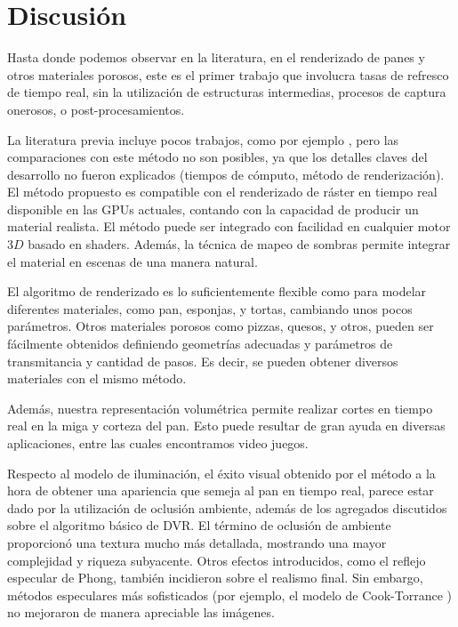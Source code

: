 \section{Discusión}


Hasta donde podemos observar en la literatura, en el renderizado de panes y otros materiales porosos, este es el primer trabajo que involucra tasas de refresco de tiempo real, sin la utilización de estructuras intermedias, procesos de captura onerosos, o post-procesamientos.

La literatura previa incluye pocos trabajos, como por ejemplo \cite{Cho2007}, pero las comparaciones con este método no son posibles, ya que los detalles claves del desarrollo no fueron explicados (tiempos de cómputo, método de renderización).
El método propuesto es compatible con el renderizado de ráster en tiempo real disponible en las GPUs actuales, contando con la capacidad de producir un material realista.
El método puede ser integrado con facilidad en cualquier motor $3D$ basado en shaders.
Además, la técnica de mapeo de sombras permite integrar el material en escenas de una manera natural.


El algoritmo de renderizado es lo suficientemente flexible como para modelar diferentes materiales, como pan, esponjas, y tortas, cambiando unos pocos parámetros.
Otros materiales porosos como pizzas, quesos, y otros, pueden ser fácilmente obtenidos definiendo geometrías adecuadas y parámetros de transmitancia y cantidad de pasos.
Es decir, se pueden obtener diversos materiales con el mismo método.

Además, nuestra representación volumétrica permite realizar cortes en tiempo real en la miga y corteza del pan.
Esto puede resultar de gran ayuda en diversas aplicaciones, entre las cuales encontramos video juegos.

Respecto al modelo de iluminación, el éxito visual obtenido por el método a la hora de obtener una apariencia que semeja al pan en tiempo real, parece estar dado por la utilización de oclusión ambiente, además de los agregados discutidos sobre el algoritmo básico de DVR.
El término de oclusión de ambiente proporcionó una textura mucho más detallada, mostrando una mayor complejidad y riqueza subyacente.
Otros efectos introducidos, como el reflejo especular de Phong, también incidieron sobre el realismo final.
Sin embargo, métodos especulares más sofisticados (por ejemplo, el modelo de Cook-Torrance \cite{Cook1982}) no mejoraron de manera apreciable las imágenes.

